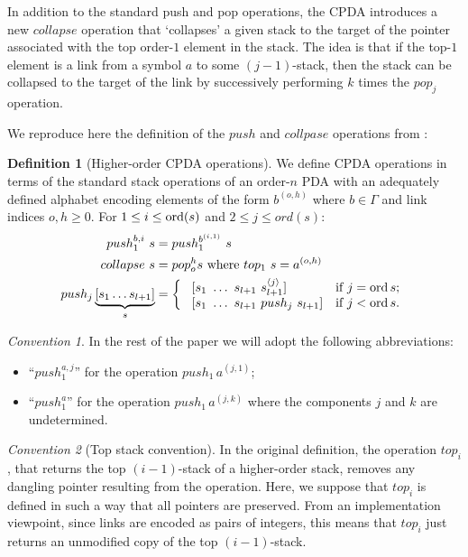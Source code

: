 \documentclass[a4paper,draft]{article}[12pt]
\theoremstyle{remark}
\newtheorem{convention}{Convention}[section]
\theoremstyle{definition}
\newtheorem{definition}{Definition}[section]
\begin{document}
In addition to the standard push and pop operations, the CPDA introduces a new $collapse$ operation that `collapses' a given stack to the target of the pointer associated with the top order-$1$ element in the stack. The idea is that if the top-$1$ element is a link from a symbol $a$ to some $(j - 1)$-stack, then the stack can be collapsed to the target of the link by successively performing $k$ times the $pop_j$ operation.

We reproduce here the definition of the $push$ and $collpase$ operations from \cite{hmos-lics08}:

\begin{definition}[Higher-order CPDA operations]
	\label{cpdastackopearations}
We define CPDA operations in terms of the standard stack operations of an order-$n$ PDA with an adequately defined alphabet encoding elements of the form $b^{(o,h)}$ where $b\in\Gamma$ and link indices $o,h \geq 0$. For $1 \leq i  \leq \mathop{\mathrm{ord}}(s)$ and $2  \leq j  \leq ord(s)$:
\begin{align*}
push_1^{b,i}\ s &= push_1^{b^{(i,1)}}\ s \\
collapse\ s &= pop_o^h s  \hbox{\ where } top_1\ s = a^{(o,h)} \\
push_j \underbrace{[ s_1 \ldots s_{l+1} ]}_{s} &=
\left\{
\begin{array}{ll}
\    [s_1\ \ldots\ s_{l+1}\ s_{l+1}^{\langle j \rangle}]  &\hbox{if $j = \mathop{\mathrm{ord}}{s}$;}\\
\    [s_1\ \ldots\ s_{l+1}\ push_j\ s_{l+1}]  &\hbox{if $j<\mathop{\mathrm{ord}}{s}$.}
\end{array}
\right.
\end{align*} 
\end{definition}

\begin{convention}
	In the rest of the paper we will adopt the following abbreviations:
\begin{itemize}
	\item ``$push_1^{a,j}$'' for the operation $push_1\,a^{(j,1)}$;
	\item ``$push_1^a$'' for the operation $push_1\,a^{(j,k)}$ where the components $j$ and $k$ are undetermined.
\end{itemize}
\end{convention}

\begin{convention}[Top stack convention]
\label{conv:top_preserve_links}
In the original definition, the operation $top_i$, that returns the top $(i-1)$-stack of a higher-order stack,
 removes any dangling pointer resulting from the operation. Here, we suppose that $top_i$ is defined in such a way that all pointers are preserved. From an implementation viewpoint, since links are encoded as pairs of integers, this means that $top_i$ just returns an unmodified copy of the top $(i-1)$-stack.
\end{convention}
\end{document}
